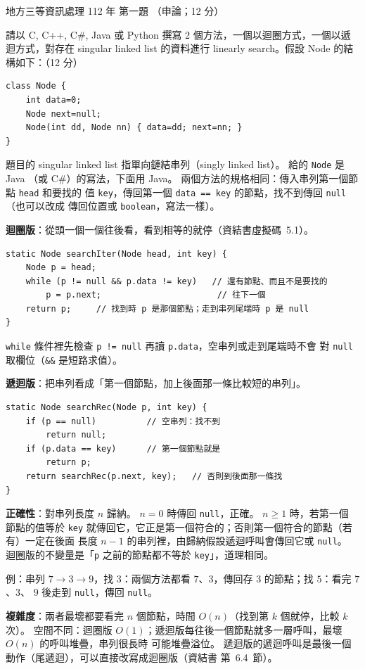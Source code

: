\begin{pastexam}[label={px:df3-112-ds-01}]{地方三等資訊處理 112 年 第一題}
（申論；12 分）

請以 C, C++, C\#, Java 或 Python 撰寫 2 個方法，一個以迴圈方式，一個以遞迴方式，對存在
singular linked list 的資料進行 linearly search。假設 Node 的結構如下：（12 分）
\begin{verbatim}
class Node {
    int data=0;
    Node next=null;
    Node(int dd, Node nn) { data=dd; next=nn; }
}
\end{verbatim}
\end{pastexam}

\begin{pastsoln}
題目的 singular linked list 指單向鏈結串列（singly linked list）。 給的 \texttt{Node} 是 Java
（或 C\#）的寫法，下面用 Java。 兩個方法的規格相同：傳入串列第一個節點 \texttt{head} 和要找的
值 \texttt{key}，傳回第一個 \texttt{data == key} 的節點，找不到傳回 \texttt{null}（也可以改成
傳回位置或 \texttt{boolean}，寫法一樣）。

\textbf{迴圈版}：從頭一個一個往後看，看到相等的就停（資結書虛擬碼~5.1）。
\begin{verbatim}
static Node searchIter(Node head, int key) {
    Node p = head;
    while (p != null && p.data != key)   // 還有節點、而且不是要找的
        p = p.next;                       // 往下一個
    return p;     // 找到時 p 是那個節點；走到串列尾端時 p 是 null
}
\end{verbatim}
\texttt{while} 條件裡先檢查 \texttt{p != null} 再讀 \texttt{p.data}，空串列或走到尾端時不會
對 \texttt{null} 取欄位（\texttt{\&\&} 是短路求值）。

\textbf{遞迴版}：把串列看成「第一個節點，加上後面那一條比較短的串列」。
\begin{verbatim}
static Node searchRec(Node p, int key) {
    if (p == null)          // 空串列：找不到
        return null;
    if (p.data == key)      // 第一個節點就是
        return p;
    return searchRec(p.next, key);   // 否則到後面那一條找
}
\end{verbatim}
\textbf{正確性}：對串列長度 $n$ 歸納。 $n = 0$ 時傳回 \texttt{null}，正確。 $n \ge 1$ 時，若第一個
節點的值等於 \texttt{key} 就傳回它，它正是第一個符合的；否則第一個符合的節點（若有）一定在後面
長度 $n - 1$ 的串列裡，由歸納假設遞迴呼叫會傳回它或 \texttt{null}。 迴圈版的不變量是「\texttt{p}
之前的節點都不等於 \texttt{key}」，道理相同。

例：串列 $7 \to 3 \to 9$，找 $3$：兩個方法都看 $7$、$3$，傳回存 $3$ 的節點；找 $5$：看完 $7$、$3$、
$9$ 後走到 \texttt{null}，傳回 \texttt{null}。

\textbf{複雜度}：兩者最壞都要看完 $n$ 個節點，時間 $O(n)$（找到第 $k$ 個就停，比較 $k$ 次）。
空間不同：迴圈版 $O(1)$；遞迴版每往後一個節點就多一層呼叫，最壞 $O(n)$ 的呼叫堆疊，串列很長時
可能堆疊溢位。 遞迴版的遞迴呼叫是最後一個動作（尾遞迴），可以直接改寫成迴圈版（資結書
第~6.4~節）。
\end{pastsoln}
